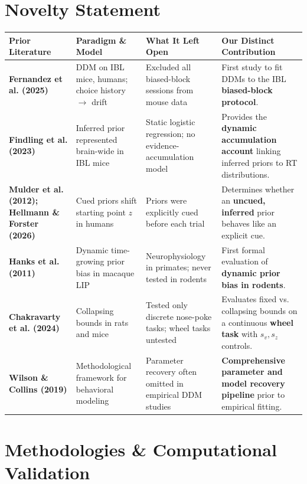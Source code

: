 \documentclass[10pt,a4paper]{article}
\begin{document}
\section{Novelty Statement}

\begin{table}[h!]
\centering
\small
\begin{tabularx}{\textwidth}{>{\raggedright\arraybackslash}p{3.2cm} >{\raggedright\arraybackslash}p{3.3cm} >{\raggedright\arraybackslash}p{3.5cm} >{\raggedright\arraybackslash}X}
\toprule
\textbf{Prior Literature} & \textbf{Paradigm \& Model} & \textbf{What It Left Open} & \textbf{Our Distinct Contribution} \\
\midrule
\textbf{Fernandez et al. (2025)} & DDM on IBL mice, humans; choice history $\to$ drift & Excluded all biased-block sessions from mouse data & First study to fit DDMs to the IBL \textbf{biased-block protocol}. \\
\textbf{Findling et al. (2023)} & Inferred prior represented brain-wide in IBL mice & Static logistic regression; no evidence-accumulation model & Provides the \textbf{dynamic accumulation account} linking inferred priors to RT distributions. \\
\textbf{Mulder et al. (2012); Hellmann \& Forster (2026)} & Cued priors shift starting point $z$ in humans & Priors were explicitly cued before each trial & Determines whether an \textbf{uncued, inferred} prior behaves like an explicit cue. \\
\textbf{Hanks et al. (2011)} & Dynamic time-growing prior bias in macaque LIP & Neurophysiology in primates; never tested in rodents & First formal evaluation of \textbf{dynamic prior bias in rodents}. \\
\textbf{Chakravarty et al. (2024)} & Collapsing bounds in rats and mice & Tested only discrete nose-poke tasks; wheel tasks untested & Evaluates fixed vs. collapsing bounds on a continuous \textbf{wheel task} with $s_v, s_z$ controls. \\
\textbf{Wilson \& Collins (2019)} & Methodological framework for behavioral modeling & Parameter recovery often omitted in empirical DDM studies & \textbf{Comprehensive parameter and model recovery pipeline} prior to empirical fitting. \\
\bottomrule
\end{tabularx}
\end{table}

\section{Methodologies \& Computational Validation}
\end{document}
